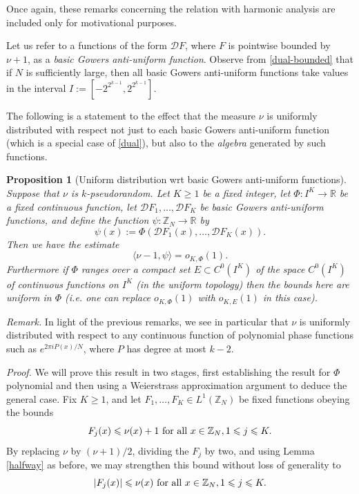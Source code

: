 \documentclass[12pt,a4paper,reqno]{amsart}
\numberwithin{equation}{section}
\theoremstyle{plain}
\newtheorem{proposition}[subsection]{Proposition}
\theoremstyle{definition}
\renewcommand{\leq}{\leqslant}
\renewcommand{\geq}{\geqslant}
\def\D{{\mathcal D}}
\def\Z{{\mathbb Z}}
\def\R{{\mathbb R}}
\def\vs{\vspace{11pt}}
\def\ni{\noindent}
\def\proof{\noindent\textit{Proof. }}
\def\emph#1{{\it #1}}
\begin{document}
\ni Once again, these remarks concerning the relation with harmonic analysis are included only for motivational purposes.\vs

\ni Let us refer to a functions of the form ${\mathcal D} F$, where $F$ is pointwise bounded by $\nu+1$, as a \emph{basic Gowers anti-uniform function}.
Observe from \eqref{dual-bounded} that if $N$ is sufficiently large, then all basic Gowers anti-uniform functions take values
in the interval $I := [-2^{2^{k-1}}, 2^{2^{k-1}}]$.\vs

\ni The following is a statement to the effect that the measure $\nu$ is uniformly distributed with respect not just to each basic Gowers anti-uniform function
(which is a special case of \eqref{dual}), but also to the \emph{algebra} generated by such functions.

\begin{proposition}[Uniform distribution wrt basic Gowers anti-uniform functions]\label{weier} Suppose that $\nu$ is $k$-pseudorandom. Let $K \geq 1$ be a fixed integer, let $\Phi: I^K \to \R$ be a fixed continuous function, let $\D F_1, \ldots, \D F_K$ be basic Gowers anti-uniform functions,
and define the function $\psi: \Z_N \to \R$ by
\[ \psi(x) := \Phi({\mathcal D} F_1(x), \ldots, {\mathcal D} F_K(x)).\]
Then we have the estimate
$$ \langle \nu - 1, \psi \rangle = o_{K,\Phi}(1).$$
Furthermore if $\Phi$ ranges over a compact set $E \subset C^0(I^K)$ of the space $C^0(I^K)$ of continuous functions on $I^K$ \textup{(}in the uniform topology\textup{)} then the bounds here are uniform in $\Phi$ \textup{(}i.e. one can replace $o_{K,\Phi}(1)$ with
$o_{K,E}(1)$ in this case\textup{)}.
\end{proposition}

\noindent\textit{Remark.} In light of the previous remarks, we see in particular that $\nu$ is uniformly distributed with respect to any continuous
function of polynomial phase functions such as $e^{2\pi i P(x)/N}$, where $P$ has degree at most $k-2$.  \vs

\proof We will prove this result in two stages, first establishing the result for $\Phi$ polynomial and then using a Weierstrass approximation argument to deduce the general case.  Fix $K \geq 1$, and let $F_1, \ldots, F_K \in L^1(\Z_N)$ be fixed functions obeying the bounds 
$$ F_j(x) \leq \nu(x) + 1 \hbox{ for all } x \in \Z_N, 1 \leq j \leq K.$$
By replacing
$\nu$ by $(\nu+1)/2$, dividing the $F_j$ by two, and using Lemma \ref{halfway} as before, we may strengthen this bound without loss of generality to
\begin{equation}\label{fjb-better}
 |F_j(x)| \leq \nu(x) \hbox{ for all } x \in \mathbb{Z}_N, 1 \leq j \leq K.
\end{equation}
\end{document}
